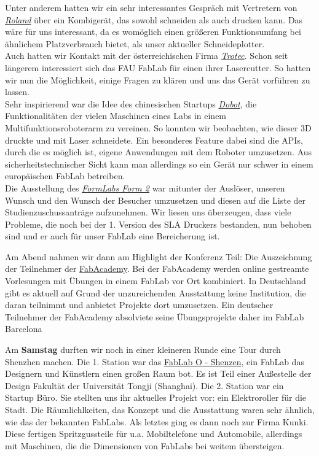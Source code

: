 \documentclass{\basedir/fablab-document}
\begin{document}
Unter anderem hatten wir ein sehr interessantes Gespräch mit Vertretern
von \href{http://www.rolanddg.com/}{\emph{Roland}} über ein Kombigerät,
das sowohl schneiden als auch drucken kann. Das wäre für uns
interessant, da es womöglich einen größeren Funktionsumfang bei
ähnlichem Platzverbrauch bietet, als unser aktueller Schneideplotter.\\
Auch hatten wir Kontakt mit der österreichischen Firma
\href{https://www.troteclaser.com/}{\emph{Trotec}}. Schon seit längerem
interessiert sich das FAU FabLab für einen ihrer Lasercutter. So hatten
wir nun die Möglichkeit, einige Fragen zu klären und uns das Gerät
vorführen zu lassen.\\
Sehr inspirierend war die Idee des chinesischen
Startups \href{http://dobot.cc/}{\emph{Dobot}}, die Funktionalitäten der
vielen Maschinen eines Labs in einem Multifunktionsroboterarm zu
vereinen. So konnten wir beobachten, wie dieser 3D druckte und mit Laser
schneidete. Ein besonderes Feature dabei sind die APIs, durch die es möglich
ist, eigene Anwendungen mit dem Roboter umzusetzen. Aus
sicherheitstechnischer Sicht kann man allerdings so ein Gerät nur schwer
in einem europäischen FabLab betreiben.\\
Die Ausstellung des
\href{https://formlabs.com/}{\emph{FormLabs Form 2}} war mitunter der
Auslöser, unseren Wunsch und den Wunsch der Besucher umzusetzen und diesen auf die Liste der
Studienzuschussanträge aufzunehmen. Wir liesen uns überzeugen, dass viele
Probleme, die noch bei der 1. Version des SLA Druckers bestanden, nun
behoben sind und er auch für unser FabLab eine Bereicherung ist.

Am Abend nahmen wir dann am Highlight der Konferenz Teil: Die
Auszeichnung der Teilnehmer der
\href{http://fabacademy.org/}{FabAcademy}. Bei der FabAcademy werden
online gestreamte Vorlesungen mit Übungen in einem FabLab vor Ort
kombiniert. In Deutschland gibt es aktuell auf Grund der unzureichenden
Ausstattung keine Institution, die daran teilnimmt und anbietet Projekte dort
umzusetzen. Ein deutscher Teilnehmer der FabAcademy absolviete seine
Übungsprojekte daher im FabLab Barcelona

Am \textbf{Samstag} durften wir noch in einer kleineren Runde eine Tour
durch Shenzhen machen. Die 1. Station war das
\href{https://www.fablabs.io/fablaboshenzhen}{FabLab O - Shenzen}, ein
FabLab das Designern und Künstlern einen großen Raum bot. Es ist
Teil einer Außestelle der Design Fakultät der Universität Tongji
(Shanghai). Die 2. Station war ein Startup Büro. Sie stellten uns ihr
aktuelles Projekt vor: ein Elektroroller für die Stadt. Die
Räumlichlkeiten, das Konzept und die Ausstattung waren sehr ähnlich, wie
das der bekannten FabLabs. Als letztes ging es dann noch zur Firma
Kunki. Diese fertigen Spritzgussteile für u.a. Mobiltelefone und
Automobile, allerdings mit Maschinen, die die Dimensionen von FabLabs
bei weitem übersteigen.
\end{document}
